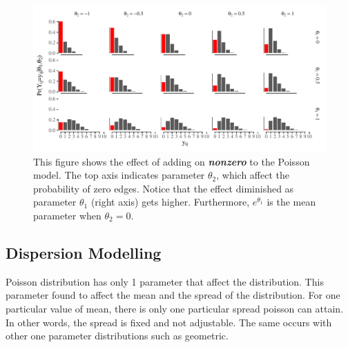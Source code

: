 \documentclass[12pt,a4paper,twoside,openany]{book}\usepackage[]{graphicx}\usepackage[]{color}
\makeatletter
\def\maxwidth{ %
  \ifdim\Gin@nat@width>\linewidth
    \linewidth
  \else
    \Gin@nat@width
  \fi
}
\newenvironment{knitrout}{}{} %
\makeatother
\begin{document}
\begin{figure}[H]
\begin{knitrout}
\color{fgcolor}

{\centering \includegraphics[width=\maxwidth]{figure/unnamed-chunk-2-1} 

}



\end{knitrout}
\caption ["Illustration of Zero-Modified Poisson"]{This figure shows the effect of adding on \textit{\textbf{nonzero}} to the Poisson model. The top axis indicates parameter $\theta_2$, which affect the probability of zero edges. Notice that the effect diminished as parameter $\theta_1$ (right axis) gets higher. Furthermore, $e^{\theta_1}$ is the mean parameter when $\theta_2=0$.}
\label{fig: Zero Modified Poisson}
\end{figure}


\subsection{Dispersion Modelling}
Poisson distribution has only 1 parameter that affect the distribution. This parameter found to affect the mean and the spread of the distribution. For one particular value of mean, there is only one particular spread poisson can attain. In other words, the spread is fixed and not adjustable. The same occurs with other one parameter distributions such as geometric.
\end{document}
